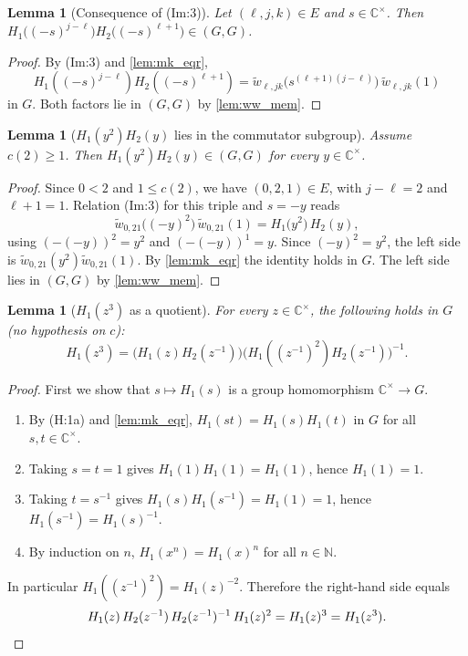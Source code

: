\documentclass[11pt]{article}
\newtheorem{lemma}[theorem]{Lemma}
\theoremstyle{definition}
\theoremstyle{remark}
\newcommand{\N}{\mathbb{N}}
\newcommand{\Cx}{\mathbb{C}^{\times}}
\newcommand{\wt}{\widetilde{w}}
\newcommand{\comm}{(G,G)}
\begin{document}
\begin{lemma}[Consequence of (Im:3)]\label{lem:im3_mem}
Let $(\ell,j,k)\in E$ and $s\in\Cx$. Then $H_1\big((-s)^{j-\ell}\big)H_2\big((-s)^{\ell+1}\big)\in\comm$.
\end{lemma}
\begin{proof}
By (Im:3) and \cref{lem:mk_eqr},
\[
H_1((-s)^{j-\ell})H_2((-s)^{\ell+1})=\wt_{\ell,jk}\big(s^{(\ell+1)(j-\ell)}\big)\,\wt_{\ell,jk}(1)
\]
in $G$. Both factors lie in $\comm$ by \cref{lem:ww_mem}.
\end{proof}

\begin{lemma}[$H_1(y^2)H_2(y)$ lies in the commutator subgroup]\label{lem:h1sq_h2_mem}
Assume $c(2)\ge1$. Then $H_1(y^2)H_2(y)\in\comm$ for every $y\in\Cx$.
\end{lemma}
\begin{proof}
Since $0<2$ and $1\le c(2)$, we have $(0,2,1)\in E$, with $j-\ell=2$ and $\ell+1=1$. Relation (Im:3) for this triple and $s=-y$ reads
\[
\wt_{0,21}\big((-y)^{2}\big)\,\wt_{0,21}(1)=H_1\big(y^{2}\big)\,H_2(y),
\]
using $(-(-y))^2=y^2$ and $(-(-y))^1=y$. Since $(-y)^2=y^2$, the left side is $\wt_{0,21}(y^2)\wt_{0,21}(1)$. By \cref{lem:mk_eqr} the identity holds in $G$. The left side lies in $\comm$ by \cref{lem:ww_mem}.
\end{proof}

\begin{lemma}[$H_1(z^3)$ as a quotient]\label{lem:h1_cube_eq}
For every $z\in\Cx$, the following holds in $G$ (no hypothesis on $c$):
\[
H_1(z^3)=\big(H_1(z)H_2(z^{-1})\big)\big(H_1((z^{-1})^2)H_2(z^{-1})\big)^{-1}.
\]
\end{lemma}
\begin{proof}
First we show that $s\mapsto H_1(s)$ is a group homomorphism $\Cx\to G$.
\begin{enumerate}
\item By (H:1a) and \cref{lem:mk_eqr}, $H_1(st)=H_1(s)H_1(t)$ in $G$ for all $s,t\in\Cx$.
\item Taking $s=t=1$ gives $H_1(1)H_1(1)=H_1(1)$, hence $H_1(1)=1$.
\item Taking $t=s^{-1}$ gives $H_1(s)H_1(s^{-1})=H_1(1)=1$, hence $H_1(s^{-1})=H_1(s)^{-1}$.
\item By induction on $n$, $H_1(x^n)=H_1(x)^n$ for all $n\in\N$.
\end{enumerate}
In particular $H_1((z^{-1})^2)=H_1(z)^{-2}$. Therefore the right-hand side equals
\[
H_1(z)\,H_2(z^{-1})\,H_2(z^{-1})^{-1}\,H_1(z)^{2}=H_1(z)^3=H_1(z^3). \qedhere
\]
\end{proof}
\end{document}
